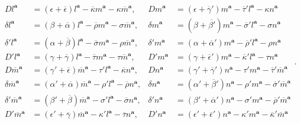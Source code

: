 \begin{equation*}
	\begin{aligned}
		Dl^{\boldsymbol{a}} & =(\epsilon +\overline{\epsilon } )l^{\boldsymbol{a}} -\overline{\kappa } m^{\boldsymbol{a}} -\kappa \overline{m}^{\boldsymbol{a}} , & Dm^{\boldsymbol{a}} & =(\epsilon +\overline{\gamma } ')m^{\boldsymbol{a}} -\overline{\tau } 'l^{\boldsymbol{a}} -\kappa n^{\boldsymbol{a}}\\
		\delta l^{\boldsymbol{a}} & =(\beta +\overline{\alpha } )l^{\boldsymbol{a}} -\overline{\rho } m^{\boldsymbol{a}} -\sigma \overline{m}^{\boldsymbol{a}} , & \delta m^{\boldsymbol{a}} & =(\beta +\overline{\beta '} )m^{\boldsymbol{a}} -\overline{\sigma } 'l^{\boldsymbol{a}} -\sigma n^{\boldsymbol{a}}\\
		\delta 'l^{\boldsymbol{a}} & =(\alpha +\overline{\beta } )l^{\boldsymbol{a}} -\overline{\sigma } m^{\boldsymbol{a}} -\rho \overline{m}^{\boldsymbol{a}} , & \delta 'm^{\boldsymbol{a}} & =(\alpha +\overline{\alpha } ')m^{\boldsymbol{a}} -\overline{\rho } 'l^{\boldsymbol{a}} -\rho n^{\boldsymbol{a}}\\
		D'l^{\boldsymbol{a}} & =(\gamma +\overline{\gamma } )l^{\boldsymbol{a}} -\overline{\tau } m^{\boldsymbol{a}} -\tau \overline{m}^{\boldsymbol{a}} , & D'm^{\boldsymbol{a}} & =(\gamma +\overline{\epsilon } ')m^{\boldsymbol{a}} -\overline{\kappa } 'l^{\boldsymbol{a}} -\tau n^{\boldsymbol{a}}\\
		D\overline{m}^{\boldsymbol{a}} & =(\gamma '+\overline{\epsilon } )\overline{m}^{\boldsymbol{a}} -\tau 'l^{\boldsymbol{a}} -\overline{\kappa } n^{\boldsymbol{a}} , & Dn^{\boldsymbol{a}} & =(\gamma '+\overline{\gamma } ')n^{\boldsymbol{a}} -\tau 'm^{\boldsymbol{a}} -\overline{\tau } '\overline{m}^{\boldsymbol{a}}\\
		\delta \overline{m}^{\boldsymbol{a}} & =(\alpha '+\overline{\alpha } )\overline{m}^{\boldsymbol{a}} -\rho 'l^{\boldsymbol{a}} -\overline{\rho } n^{\boldsymbol{a}} , & \delta n^{\boldsymbol{a}} & =(\alpha '+\overline{\beta } ')n^{\boldsymbol{a}} -\rho 'm^{\boldsymbol{a}} -\overline{\sigma } '\overline{m}^{\boldsymbol{a}}\\
		\delta '\overline{m}^{\boldsymbol{a}} & =(\beta '+\overline{\beta } )\overline{m}^{\boldsymbol{a}} -\sigma 'l^{\boldsymbol{a}} -\overline{\sigma } n^{\boldsymbol{a}} , & \delta 'n^{\boldsymbol{a}} & =(\beta '+\overline{\alpha } ')n^{\boldsymbol{a}} -\sigma 'm^{\boldsymbol{a}} -\overline{\rho } '\overline{m}^{\boldsymbol{a}}\\
		D'\overline{m}^{\boldsymbol{a}} & =(\epsilon '+\overline{\gamma } )\overline{m}^{\boldsymbol{a}} -\kappa 'l^{\boldsymbol{a}} -\overline{\tau } n^{\boldsymbol{a}} , & D'n^{\boldsymbol{a}} & =(\epsilon '+\overline{\epsilon } ')n^{\boldsymbol{a}} -\kappa 'm^{\boldsymbol{a}} -\overline{\kappa } '\overline{m}^{\boldsymbol{a}}
	\end{aligned} .
\end{equation*}


